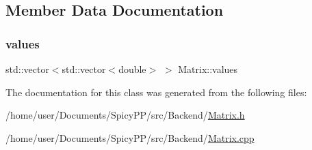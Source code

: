 \subsection{Member Data Documentation}
\mbox{\label{classMatrix_a5987175ae045377790ff0b1f6cfd2e7b}} 
\subsubsection{\texorpdfstring{values}{values}}
{\footnotesize\ttfamily std\+::vector$<$std\+::vector$<$double$>$ $>$ Matrix\+::values\hspace{0.3cm}{\ttfamily [private]}}



The documentation for this class was generated from the following files\+:\begin{DoxyCompactItemize}
\item 
/home/user/\+Documents/\+Spicy\+P\+P/src/\+Backend/\hyperlink{Matrix_8h}{Matrix.\+h}\item 
/home/user/\+Documents/\+Spicy\+P\+P/src/\+Backend/\hyperlink{Matrix_8cpp}{Matrix.\+cpp}\end{DoxyCompactItemize}
